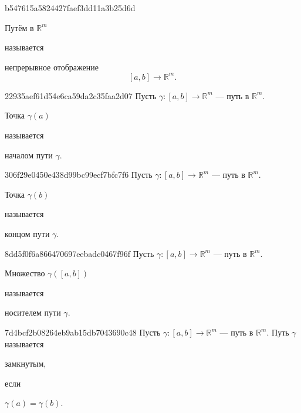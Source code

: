 \begin{note}{b547615a5824427faef3dd11a3b25d6d}
    \begin{icloze}{2}Путём в \({ \mathbb R^{m} }\)\end{icloze} называется
    \begin{icloze}{1}
        непрерывное отображение
        \[
            [a, b] \to \mathbb R^{m}.
        \]
    \end{icloze}
\end{note}

\begin{note}{22935aef61d54e6ca59da2c35faa2d07}
    Пусть \({ \gamma : [a, b] \to \mathbb R^{m} }\) --- путь в \({ \mathbb R^{m} }\).
    \begin{icloze}{2}Точка \({ \gamma(a) }\)\end{icloze} называется \begin{icloze}{1}началом пути \({ \gamma }\).\end{icloze}
\end{note}

\begin{note}{306f29e0450e438d99bc99ecf7bfc7f6}
    Пусть \({ \gamma : [a, b] \to \mathbb R^{m} }\) --- путь в \({ \mathbb R^{m} }\).
    \begin{icloze}{2}Точка \({ \gamma(b) }\)\end{icloze} называется \begin{icloze}{1}концом пути \({ \gamma }\).\end{icloze}
\end{note}

\begin{note}{8dd5f0f6a866470697eebadc0467f96f}
    Пусть \({ \gamma : [a, b] \to \mathbb R^{m} }\) --- путь в \({ \mathbb R^{m} }\).
    \begin{icloze}{1}Множество \({ \gamma([a, b]) }\)\end{icloze} называется \begin{icloze}{2}носителем пути \({ \gamma }\).\end{icloze}
\end{note}

\begin{note}{7d4bcf2b08264eb9ab15db7043690c48}
    Пусть \({ \gamma : [a, b] \to \mathbb R^{m} }\) --- путь в \({ \mathbb R^{m} }\).
    Путь \({ \gamma }\) называется \begin{icloze}{2}замкнутым,\end{icloze} если \begin{icloze}{1}\({ \gamma(a) = \gamma(b) }\).\end{icloze}
\end{note}

